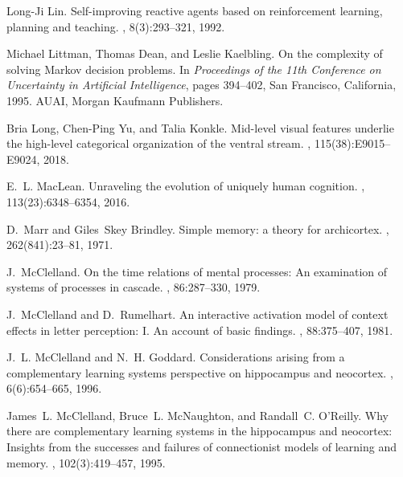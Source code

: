 \documentclass[letterpaper,11pt]{article}
\begin{document}
\begin{thebibliography}{100}
Long-Ji Lin.
\newblock Self-improving reactive agents based on reinforcement learning,
  planning and teaching.
, 8(3):293--321, 1992.

Michael Littman, Thomas Dean, and Leslie Kaelbling.
\newblock On the complexity of solving {M}arkov decision problems.
\newblock In {\em Proceedings of the 11th Conference on Uncertainty in
  Artificial Intelligence}, pages 394--402, San Francisco, California, 1995.
  AUAI, Morgan Kaufmann Publishers.

Bria Long, Chen-Ping Yu, and Talia Konkle.
\newblock Mid-level visual features underlie the high-level categorical
  organization of the ventral stream.
,
  115(38):E9015--E9024, 2018.

E.~L. MacLean.
\newblock Unraveling the evolution of uniquely human cognition.
,
  113(23):6348--6354, 2016.

D.~Marr and Giles~Skey Brindley.
\newblock Simple memory: a theory for archicortex.
, 262(841):23--81, 1971.

J.~McClelland.
\newblock On the time relations of mental processes: {A}n examination of
  systems of processes in cascade.
, 86:287--330, 1979.

J.~McClelland and D.~Rumelhart.
\newblock An interactive activation model of context effects in letter
  perception: {I}. {A}n account of basic findings.
, 88:375--407, 1981.

J.~L. McClelland and N.~H. Goddard.
\newblock Considerations arising from a complementary learning systems
  perspective on hippocampus and neocortex.
, 6(6):654--665, 1996.

James~L. McClelland, Bruce~L. McNaughton, and Randall~C. O'Reilly.
\newblock Why there are complementary learning systems in the hippocampus and
  neocortex: {I}nsights from the successes and failures of connectionist models
  of learning and memory.
, 102(3):419--457, 1995.


\end{thebibliography}
\end{document}
